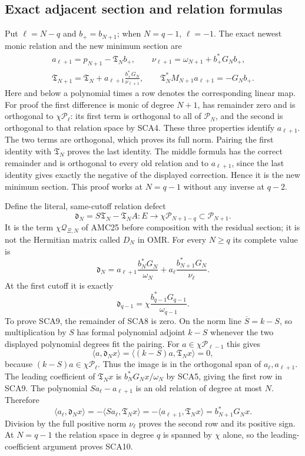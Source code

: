 \subsection{Exact adjacent section and relation formulas}

Put $\ell=N-q$ and $b_+=b_{N+1}$; when $N=q-1$, $\ell=-1$.
The exact newest monic relation and the new minimum section are
\[
 \begin{gathered}
 a_{\ell+1}=p_{N+1}-\mathfrak T_Nb_+,\qquad
 \nu_{\ell+1}=\omega_{N+1}+b_+^*G_Nb_+,\\
 \mathfrak T_{N+1}
   =\mathfrak T_N+a_{\ell+1}\frac{b_+^*G_N}{\nu_{\ell+1}},\qquad
 \mathfrak T_N^*M_{N+1}a_{\ell+1}=-G_Nb_+.
 \end{gathered}\tag{SCA7}
\]
Here and below a polynomial times a row denotes the corresponding linear
map. For proof the first difference is monic of degree $N+1$, has remainder
zero and is orthogonal to $\chi\mathcal P_{\ell}$: its first term is
orthogonal to all of $\mathcal P_N$, and the second is orthogonal to that
relation space by SCA4. These three properties identify $a_{\ell+1}$.
The two terms are orthogonal, which proves its full norm. Pairing the first
identity with $\mathfrak T_N$ proves the last identity.
The middle formula has the correct remainder and is orthogonal to every old
relation and to $a_{\ell+1}$, since the last identity gives exactly the
negative of the displayed correction. Hence it is the new minimum section.
This proof works at $N=q-1$ without any inverse at $q-2$.

Define the literal, same-cutoff relation defect
\[
 \mathfrak d_N=S\mathfrak T_N-\mathfrak T_NA:
        E\longrightarrow\chi\mathcal P_{N+1-q}\subset\mathcal P_{N+1}.
 \tag{SCA8}
\]
It is the term $\chi\mathcal Q_{\Xi,N}$ of AMC25 before composition with
the residual section; it is not the Hermitian matrix called $D_N$ in OMR.
For every $N\ge q$ its complete value is
\[
 \boxed{\mathfrak d_N
   =a_{\ell+1}\frac{b_N^*G_N}{\omega_N}
      +a_\ell\frac{b_{N+1}^*G_N}{\nu_\ell}.}
 \tag{SCA9}
\]
At the first cutoff it is exactly
\[
 \mathfrak d_{q-1}=\chi\frac{b_{q-1}^*G_{q-1}}{\omega_{q-1}}.
 \tag{SCA10}
\]
To prove SCA9, the remainder of SCA8 is zero. On the norm line
$\overline S=k-S$, so multiplication by $S$ has formal polynomial adjoint
$k-S$ whenever the two displayed polynomial degrees fit the pairing.
For $a\in\chi\mathcal P_{\ell-1}$ this gives
\[
 \langle a,\mathfrak d_Nx\rangle
 =\langle(k-S)a,\mathfrak T_Nx\rangle=0,
\]
because $(k-S)a\in\chi\mathcal P_\ell$. Thus the image is in the
orthogonal span of $a_\ell,a_{\ell+1}$. The leading coefficient of
$\mathfrak T_Nx$ is $b_N^*G_Nx/\omega_N$ by SCA5, giving the first row
in SCA9. The polynomial $Sa_\ell-a_{\ell+1}$ is an old relation of
degree at most $N$.
Therefore
\[
 \langle a_\ell,\mathfrak d_Nx\rangle
 =-\langle Sa_\ell,\mathfrak T_Nx\rangle
 =-\langle a_{\ell+1},\mathfrak T_Nx\rangle
 =b_{N+1}^*G_Nx.
\]
Division by the full positive norm $\nu_\ell$ proves the second row and
its positive sign. At $N=q-1$ the relation space in degree $q$ is spanned
by $\chi$ alone, so the leading-coefficient argument proves SCA10.

